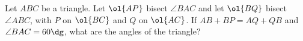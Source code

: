 Let $ABC$ be a triangle.
Let $\ol{AP}$ bisect $\angle BAC$ and let $\ol{BQ}$ bisect $\angle ABC$,
with $P$ on $\ol{BC}$ and $Q$ on $\ol{AC}$.
If $AB + BP = AQ + QB$ and $\angle BAC = 60\dg$,
what are the angles of the triangle?